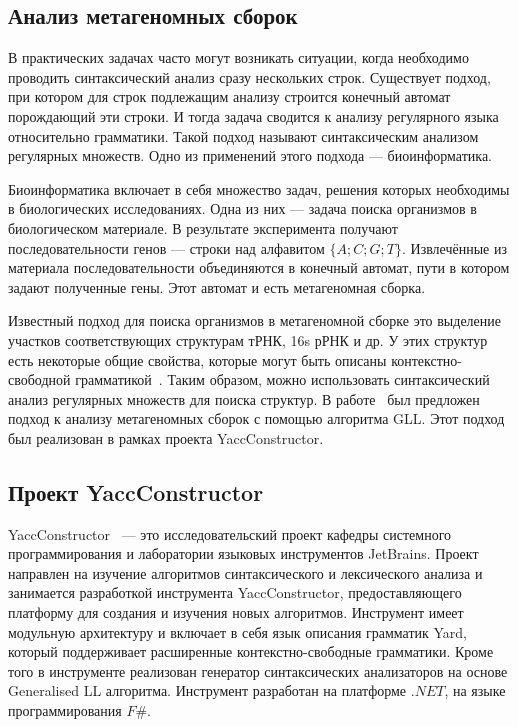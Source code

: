 \documentclass[14pt]{matmex-diploma-custom}
\begin{document}
	\subsection{Анализ метагеномных сборок}
	В практических задачах часто могут возникать ситуации, когда необходимо проводить синтаксический анализ 
    сразу нескольких строк. Существует подход, при котором для строк подлежащим анализу строится 
    конечный автомат порождающий эти строки. И тогда задача сводится к анализу регулярного языка относительно 
    грамматики. Такой подход называют синтаксическим анализом регулярных множеств. Одно из применений этого подхода ---
    биоинформатика.
    
    Биоинформатика включает в себя множество задач, решения которых необходимы в биологических исследованиях.
    Одна из них --- задача поиска организмов в биологическом материале.
    В результате эксперимента получают последовательности генов --- строки над алфавитом $\{A;C; G; T\}$.
    Извлечённые из материала последовательности объединяются в конечный автомат, пути в котором задают полученные 
    гены. Этот автомат и есть метагеномная сборка.
    
    Известный подход для поиска организмов в метагеномной сборке это выделение участков соответствующих структурам
    тРНК, 16s рРНК и др. У этих структур есть некоторые общие свойства, которые могут быть описаны
    контекстно-свободной грамматикой~\cite{Anderson2013}.
    Таким образом, можно использовать синтаксический анализ регулярных множеств для поиска структур.
	В работе~\cite{ragozina} был предложен подход к анализу метагеномных
	сборок с помощью алгоритма GLL. Этот подход был реализован в рамках проекта YaccConstructor.
	
    \subsection{Проект YaccConstructor}
    YaccConstructor~\cite{YaccConstructor} --- это исследовательский проект кафедры системного программирования и лаборатории
    языковых инструментов JetBrains. Проект направлен на изучение алгоритмов синтаксического и 
    лексического анализа и занимается разработкой инструмента YaccConstructor, предоставляющего платформу для
    создания и изучения новых алгоритмов. Инструмент имеет модульную архитектуру и включает в себя язык описания 
    грамматик Yard, который поддерживает расширенные контекстно-свободные грамматики. Кроме того в инструменте 
    реализован генератор синтаксических анализаторов на основе Generalised LL алгоритма.
    Инструмент разработан на платформе $.NET$, на языке программирования $F\#$.
    
\end{document}
